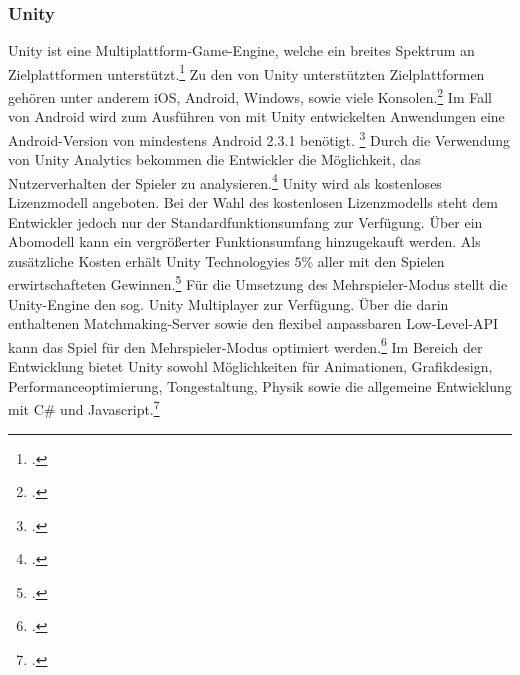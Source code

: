 	\subsubsection*{Unity}
	Unity ist eine Multiplattform-Game-Engine, welche ein breites Spektrum an Zielplattformen unterstützt.\footcite{unity-home} Zu den von Unity unterstützten Zielplattformen gehören unter anderem iOS, Android, Windows, sowie viele Konsolen.\footcite[\url{https://unity3d.com/de/unity/multiplatform}]{unity-home} Im Fall von Android wird zum Ausführen von mit Unity entwickelten Anwendungen eine Android-Version von mindestens Android 2.3.1 benötigt. \footcite[\url{https://unity3d.com/de/unity/system-requirements}]{unity-home} Durch die Verwendung von Unity Analytics bekommen die Entwickler die Möglichkeit, das Nutzerverhalten der Spieler zu analysieren.\footcite[\url{https://unity3d.com/de/services/analytics}]{unity-home} Unity wird als kostenloses Lizenzmodell angeboten. Bei der Wahl des kostenlosen Lizenzmodells steht dem Entwickler jedoch nur der Standardfunktionsumfang zur Verfügung. Über ein Abomodell kann ein vergrößerter Funktionsumfang hinzugekauft werden. Als zusätzliche Kosten erhält Unity Technologyies $5$\% aller mit den Spielen erwirtschafteten Gewinnen.\footcite[\url{https://store.unity.com/de}]{unity-home}
	Für die Umsetzung des Mehrspieler-Modus stellt die Unity-Engine den sog. Unity Multiplayer zur Verfügung. Über die darin enthaltenen Matchmaking-Server sowie den flexibel anpassbaren Low-Level-API kann das Spiel für den Mehrspieler-Modus optimiert werden.\footcite[\url{https://unity3d.com/de/services/multiplayer}]{unity-home}
	Im Bereich der Entwicklung bietet Unity sowohl Möglichkeiten für Animationen, Grafikdesign, Performanceoptimierung, Tongestaltung, Physik sowie die allgemeine Entwicklung mit C\# und Javascript.\footcite[\url{https://unity3d.com/de/unity/editor}]{unity-home}

